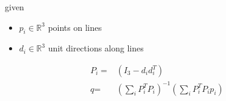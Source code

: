 \documentclass[12pt]{article}
\begin{document}
given
\begin{itemize}
\item $\textit{p}_{\textit{i}} \in \mathbb{R}^{ 3}$ points on lines
\item $\textit{d}_{\textit{i}} \in \mathbb{R}^{ 3}$ unit directions along lines
\end{itemize}

\begin{align*}
\textit{P}_{ \textit{i} } = & \left( I_{ 3 } - \textit{d}_{ \textit{i} }\textit{d}_{ \textit{i} }^T \right) \\
\textit{q} = & \left( \sum_\textit{i} \textit{P}_{ \textit{i} }^T\textit{P}_{ \textit{i} } \right)^{-1}\left( \sum_\textit{i} \textit{P}_{ \textit{i} }^T\textit{P}_{ \textit{i} }\textit{p}_{ \textit{i} } \right)
\end{align*}
\end{document}
